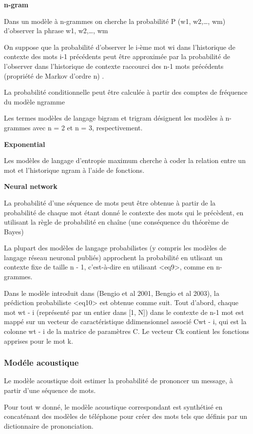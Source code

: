 \documentclass[a4paper, 12pt]{book}
\begin{document}
\textbf{n-gram}

Dans un modèle à n-grammes on cherche la probabilité P (w1, w2,…, wm) d’observer la phrase w1, w2,…, wm

On suppose que la probabilité d'observer le i-ème mot wi dans l'historique de contexte des mots i-1 précédents peut être approximée par la probabilité de l'observer dans l'historique de contexte raccourci des n-1 mots précédents (propriété de Markov d'ordre n) .

La probabilité conditionnelle peut être calculée à partir des comptes de fréquence du modèle ngramme


Les termes modèles de langage bigram et trigram désignent les modèles à n-grammes avec n = 2 et n = 3, respectivement.

\textbf{Exponential}

Les modèles de langage d'entropie maximum cherche à coder la relation entre un mot et l'historique ngram à l'aide de fonctions.

\textbf{Neural network}

La probabilité d'une séquence de mots peut être obtenue à partir de la probabilité de chaque mot étant donné le contexte des mots qui le précèdent, en utilisant la règle de probabilité en chaîne (une conséquence du théorème de Bayes)

La plupart des modèles de langage probabilistes (y compris les modèles de langage réseau neuronal publiés) approchent la probabilité en utlisant un contexte fixe de taille n - 1, c'est-à-dire en utilisant <eq9>, comme en n-grammes.

Dans le modèle introduit dans (Bengio et al 2001, Bengio et al 2003), la prédiction probabiliste <eq10> est obtenue comme suit. Tout d'abord, chaque mot wt - i (représenté par un entier dans [1, N]) dans le contexte de n-1 mot est mappé sur un vecteur de caractéristique ddimensionnel associé Cwt - i, qui est la colonne wt - i de la matrice de paramètres C. Le vecteur Ck contient les fonctions apprises pour le mot k. 



\subsubsection{Modéle acoustique}

Le modèle acoustique doit estimer la probabilité de prononcer un message, à partir d'une séquence de mots.

Pour tout w donné, le modèle acoustique correspondant est synthétisé en concaténant des modèles de téléphone pour créer des mots tels que définis par un dictionnaire de prononciation.
\end{document}

